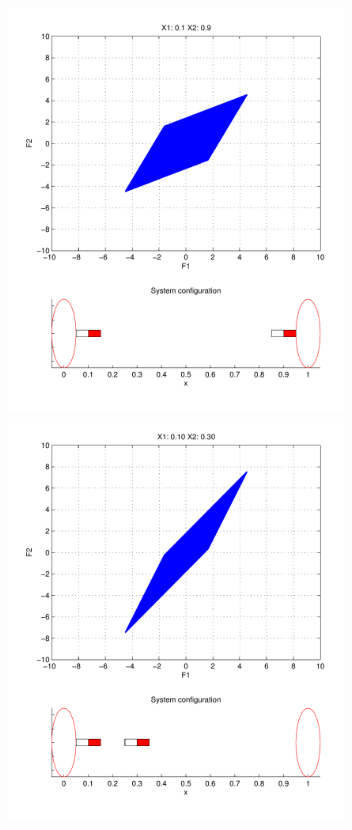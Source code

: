 \documentclass[english]{article}
\begin{document}
\begin{center}
\includegraphics[width=3.5in]{figures/X11X29_Fplot.pdf}\includegraphics[width=3.5in]{figures/X11X23_Fplot.pdf}


\end{center}
\end{document}
